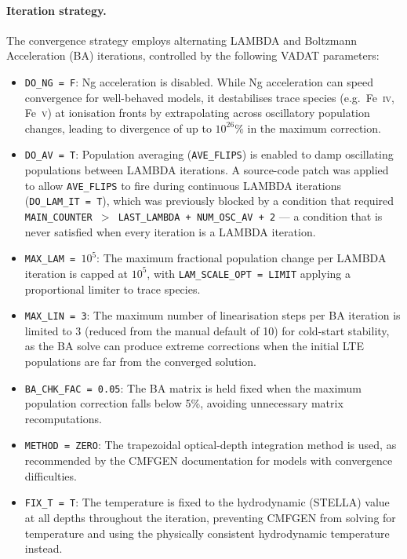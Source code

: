 \documentclass[11pt, a4paper]{article}
\begin{document}
\paragraph{Iteration strategy.}
The convergence strategy employs alternating LAMBDA and Boltzmann
Acceleration (BA) iterations, controlled by the following VADAT
parameters:
\begin{itemize}
    \item \texttt{DO\_NG\,=\,F}: Ng acceleration \citep{Ng1974} is
    disabled.  While Ng acceleration can speed convergence for well-behaved
    models, it destabilises trace species (e.g.\ Fe~\textsc{iv},
    Fe~\textsc{v}) at ionisation fronts by extrapolating across
    oscillatory population changes, leading to divergence of up to
    $10^{26}\%$ in the maximum correction.
    \item \texttt{DO\_AV\,=\,T}: Population averaging
    (\texttt{AVE\_FLIPS}) is enabled to damp oscillating populations
    between LAMBDA iterations.  A source-code patch was applied to allow
    \texttt{AVE\_FLIPS} to fire during continuous LAMBDA iterations
    (\texttt{DO\_LAM\_IT\,=\,T}), which was previously blocked by a
    condition that required \texttt{MAIN\_COUNTER $>$ LAST\_LAMBDA +
    NUM\_OSC\_AV + 2} --- a condition that is never satisfied when every
    iteration is a LAMBDA iteration.
    \item \texttt{MAX\_LAM\,=\,$10^5$}: The maximum fractional population
    change per LAMBDA iteration is capped at $10^5$, with
    \texttt{LAM\_SCALE\_OPT\,=\,LIMIT} applying a proportional limiter to
    trace species.
    \item \texttt{MAX\_LIN\,=\,3}: The maximum number of linearisation
    steps per BA iteration is limited to 3 (reduced from the manual
    default of 10) for cold-start stability, as the BA solve can produce
    extreme corrections when the initial LTE populations are far from the
    converged solution.
    \item \texttt{BA\_CHK\_FAC\,=\,0.05}: The BA matrix is held fixed
    when the maximum population correction falls below 5\%, avoiding
    unnecessary matrix recomputations.
    \item \texttt{METHOD\,=\,ZERO}: The trapezoidal optical-depth
    integration method is used, as recommended by the CMFGEN
    documentation for models with convergence difficulties.
    \item \texttt{FIX\_T\,=\,T}: The temperature is fixed to the
    hydrodynamic (STELLA) value at all depths throughout the iteration,
    preventing CMFGEN from solving for temperature and using the
    physically consistent hydrodynamic temperature instead.
\end{itemize}
\end{document}
